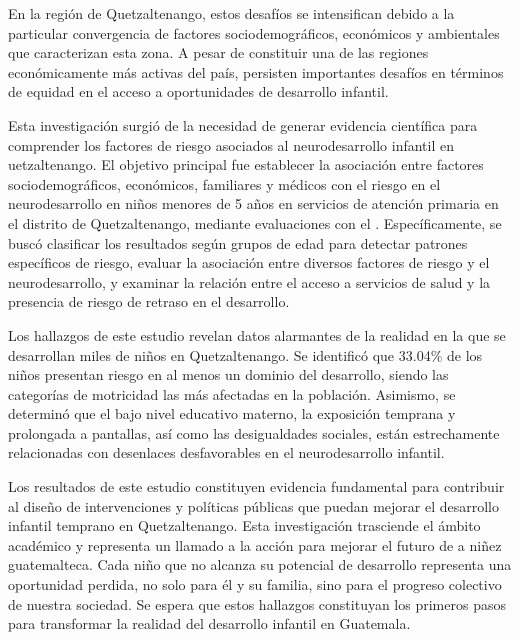 En la región de Quetzaltenango, estos desafíos se intensifican debido a la
particular convergencia de factores sociodemográficos, económicos y ambientales
que caracterizan esta zona. A pesar de constituir una de las regiones
económicamente más activas del país, persisten importantes desafíos en términos
de equidad en el acceso a oportunidades de desarrollo infantil.

Esta investigación surgió de la necesidad de generar evidencia científica para
comprender los factores de riesgo asociados al neurodesarrollo infantil en
uetzaltenango. El objetivo principal fue establecer la asociación entre
factores sociodemográficos, económicos, familiares y médicos con el riesgo en el
neurodesarrollo en niños menores de 5 años en servicios de atención primaria en
el distrito de Quetzaltenango, mediante evaluaciones con el \asq.
Específicamente, se buscó clasificar los resultados según grupos de edad para
detectar patrones específicos de riesgo, evaluar la asociación entre diversos
factores de riesgo y el neurodesarrollo, y examinar la relación entre el acceso
a servicios de salud y la presencia de riesgo de retraso en el desarrollo.

Los hallazgos de este estudio revelan datos alarmantes de la realidad en la que
se desarrollan miles de niños en Quetzaltenango. Se identificó que 33.04\% de
los niños presentan riesgo en al menos un dominio del desarrollo, siendo las
categorías de motricidad las más afectadas en la población. Asimismo, se
determinó que el bajo nivel educativo materno, la exposición temprana y
prolongada a pantallas, así como las desigualdades sociales, están estrechamente
relacionadas con desenlaces desfavorables en el neurodesarrollo infantil.

Los resultados de este estudio constituyen evidencia fundamental para contribuir
al diseño de intervenciones y políticas públicas que puedan mejorar el
desarrollo infantil temprano en Quetzaltenango. Esta investigación trasciende el
ámbito académico y representa un llamado a la acción para mejorar el futuro de
a niñez guatemalteca. Cada niño que no alcanza su potencial de desarrollo
representa una oportunidad perdida, no solo para él y su familia, sino para el
progreso colectivo de nuestra sociedad. Se espera que estos hallazgos
constituyan los primeros pasos para transformar la realidad del desarrollo
infantil en Guatemala.
